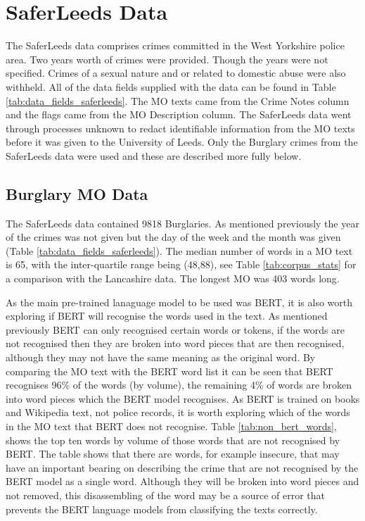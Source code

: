 \section{SaferLeeds Data} The SaferLeeds data comprises crimes committed in the West Yorkshire police area. Two years worth of crimes were provided. Though the years were not specified. Crimes of a sexual nature and or related to domestic abuse were also withheld. All of the data fields supplied with the data can be found in Table \ref{tab:data_fields_saferleeds}. The MO texts came from the Crime Notes column and the flags came from the MO Description column. The SaferLeeds data went through processes unknown to redact identifiable information from the MO texts before it was given to the University of Leeds. Only the Burglary crimes from the SaferLeeds data were used and these are described more fully below.

\subsection{Burglary MO Data} The SaferLeeds data contained 9818 Burglaries. As mentioned previously the year of the crimes was not given but the day of the week and the month was given (Table \ref{tab:data_fields_saferleeds}). The median number of words in a MO text is 65, with the inter-quartile range being (48,88), see Table \ref{tab:corpus_stats} for a comparison with the Lancashire data. The longest MO was 403 words long.


As the main pre-trained lanaguage model to be used was BERT, it is also worth exploring if BERT will recognise the words used in the text. As mentioned previously BERT can only recognised certain words or tokens, if the words are not recognised then they are broken into word pieces that are then recognised, although they may not have the same meaning as the original word. By comparing the MO text with the BERT word list it can be seen that BERT recognises 96\% of the words  (by volume), the remaining 4\% of words are broken into word pieces which the BERT model recognises. As BERT is trained on books and Wikipedia text, not police records, it is worth exploring which of the words in the MO text that BERT does not recognise. Table \ref{tab:non_bert_words}, shows the top ten words by volume of those words that are not recognised by BERT. The table shows that there are words, for example insecure, that may have an important bearing on describing the crime that are not recognised by the BERT model as a single word. Although they will be broken into word pieces and not removed, this disassembling of the word  may be a source of error that prevents the BERT language models from classifying the texts correctly.

